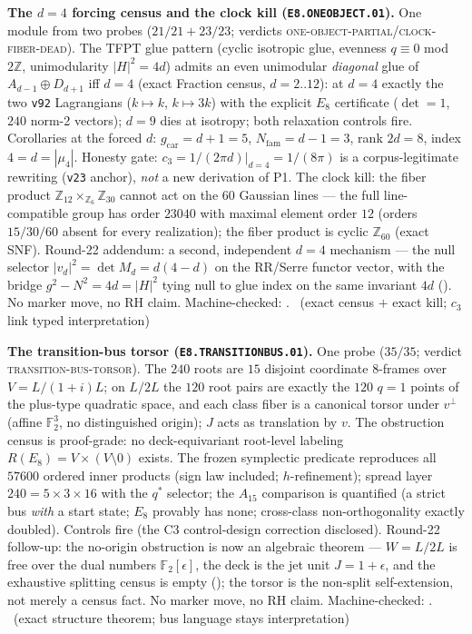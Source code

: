 \documentclass[11pt,a4paper]{article}
\newcommand{\gcar}{g_{\mathrm{car}}}
\newcommand{\Nfam}{N_{\mathrm{fam}}}
\newcommand{\Z}{\mathbb{Z}}
\theoremstyle{definition}
\begin{document}
\par\smallskip\noindent\textbf{The $d=4$ forcing census and the
clock kill (\texttt{E8.ONEOBJECT.01}).}
One module from two probes ($21/21+23/23$; verdicts
\textsc{one-object-partial}/\textsc{clock-fiber-dead}).  The TFPT
glue pattern (cyclic isotropic glue, evenness $q\equiv0$ mod $2\Z$,
unimodularity $|H|^2=4d$) admits an even unimodular \emph{diagonal}
glue of $A_{d-1}\oplus D_{d+1}$ iff $d=4$ (exact Fraction census,
$d=2..12$): at $d=4$ exactly the two \texttt{v92} Lagrangians
($k\mapsto k$, $k\mapsto 3k$) with the explicit $E_8$ certificate
($\det=1$, $240$ norm-2 vectors); $d=9$ dies at isotropy; both
relaxation controls fire.  Corollaries at the forced $d$:
$\gcar=d{+}1=5$, $\Nfam=d{-}1=3$, rank $2d=8$, index
$4=d=|\mu_4|$.  Honesty gate: $c_3=1/(2\pi d)|_{d=4}=1/(8\pi)$ is a
corpus-legitimate rewriting (\texttt{v23} anchor), \emph{not} a new
derivation of P1.  The clock kill: the fiber product
$\Z_{12}\times_{\Z_6}\Z_{30}$ cannot act on the $60$ Gaussian lines
--- the full line-compatible group has order $23040$ with maximal
element order $12$ (orders $15/30/60$ absent for every
realization); the fiber product is cyclic $\Z_{60}$ (exact SNF).
Round-22 addendum: a second, independent $d=4$ mechanism ---
the null selector $|v_d|^2=\det M_d=d(4-d)$ on the RR/Serre
functor vector, with the bridge $g^2-N^2=4d=|H|^2$ tying null to
glue index on the same invariant $4d$
().
No marker move, no RH claim.
Machine-checked: .
\mE\ (exact census $+$ exact kill; $c_3$ link typed interpretation)
\par\smallskip

\par\smallskip\noindent\textbf{The transition-bus torsor
(\texttt{E8.TRANSITIONBUS.01}).}
One probe ($35/35$; verdict \textsc{transition-bus-torsor}).  The
$240$ roots are $15$ disjoint coordinate $8$-frames over
$V=L/(1{+}i)L$; on $L/2L$ the $120$ root pairs are exactly the
$120$ $q=1$ points of the plus-type quadratic space, and each class
fiber is a canonical torsor under $v^\perp$ (affine $\mathbb F_2^3$,
no distinguished origin); $J$ acts as translation by $v$.  The
obstruction census is proof-grade: no deck-equivariant root-level
labeling $R(E_8)=V\times(V\setminus0)$ exists.  The frozen
symplectic predicate reproduces all $57600$ ordered inner products
(sign law included; $h$-refinement); spread layer
$240=5\times3\times16$ with the $q^{*}$ selector; the $A_{15}$
comparison is quantified (a strict bus \emph{with} a start state;
$E_8$ provably has none; cross-class non-orthogonality exactly
doubled).  Controls fire (the C3 control-design correction
disclosed).  Round-22 follow-up: the no-origin obstruction is now
an algebraic theorem --- $W=L/2L$ is free over the dual numbers
$\mathbb F_2[\epsilon]$, the deck is the jet unit $J=1{+}\epsilon$,
and the exhaustive splitting census is empty
(); the torsor is the
non-split self-extension, not merely a census fact.  No marker
move, no RH claim.
Machine-checked: .
\mE\ (exact structure theorem; bus language stays interpretation)
\par\smallskip
\end{document}

